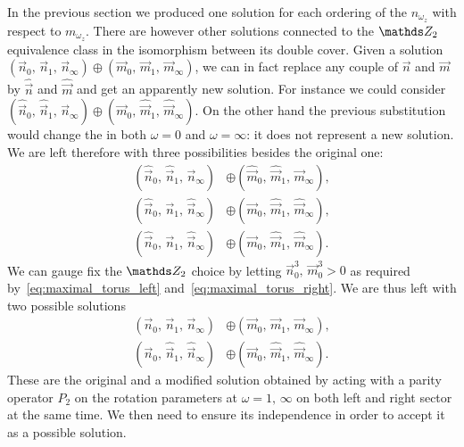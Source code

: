 In the previous section we produced one solution for each ordering of the $n_{\omega_z}$ with respect to $m_{\omega_z}$.
There are however other solutions connected to the $\Z_2$ equivalence class in the isomorphism between  its double cover.
Given a solution $(\vec{n}_{0},\, \vec{n}_{1},\, \vec{n}_{\infty}) \oplus (\vec{m}_{0},\, \vec{m}_{1},\, \vec{m}_{\infty})$, we can in fact replace any couple of $\vec{n}$ and $\vec{m}$ by $\widehat{\vec{n}}$ and $\widehat{\vec{m}}$ and get an apparently new solution.\footnotemark{}
For instance we could consider $(\widehat{\vec{n}}_{0},\, \widehat{\vec{n}}_{1},\, \vec{n}_{\infty}) \oplus (\vec{m}_{0},\, \widehat{\vec{m}}_{1},\, \widehat{\vec{m}}_{\infty})$.
On the other hand the previous substitution would change the  in both $\omega = 0$ and $\omega = \infty$: it does not represent a new solution.
We are left therefore with three possibilities besides the original one:
\begin{equation}
  \begin{split}
    (\widehat{\vec{n}}_{0},\, \widehat{\vec{n}}_{1},\, \vec{n}_{\infty})
    & \oplus
    (\widehat{\vec{m}}_{0},\, \widehat{\vec{m}}_{1},\, \vec{m}_{\infty}),
    \\
    (\widehat{\vec{n}}_{0},\, \vec{n}_{1},\, \widehat{\vec{n}}_{\infty})
    & \oplus
    (\vec{m}_{0},\, \widehat{\vec{m}}_{1},\, \widehat{\vec{m}}_{\infty}),
    \\
    (\widehat{\vec{n}}_{0},\, \vec{n}_{1},\, \widehat{\vec{n}}_{\infty})
    & \oplus
    (\vec{m}_{0},\, \widehat{\vec{m}}_{1},\, \widehat{\vec{m}}_{\infty}).
  \end{split}
\end{equation}
We can gauge fix the $\Z_2$ choice by letting $\vec{n}_{0}^3,\, \vec{m}_{0}^3 > 0$ as required by~\eqref{eq:maximal_torus_left} and~\eqref{eq:maximal_torus_right}.
We are thus left with two possible solutions
\begin{align}
  (\vec{n}_{0},\, \vec{n}_{1},\, \vec{n}_{\infty})
  & \oplus
  (\vec{m}_{0},\, \vec{m}_{1},\, \vec{m}_{\infty}),
  \\
  (\vec{n}_{0},\, \widehat{\vec{n}}_{1},\, \widehat{\vec{n}}_{\infty})
  & \oplus
  (\vec{m}_{0},\, \widehat{\vec{m}}_{1},\, \widehat{\vec{m}}_{\infty}).
\end{align}
These are the original and a modified solution obtained by acting with a parity operator $P_2$ on the rotation parameters at $\omega = 1,\, \infty$ on both left and right sector at the same time.
We then need to ensure its independence in order to accept it as a possible solution.

